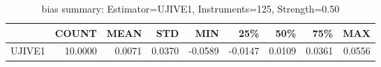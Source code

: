 \begin{table}[ht]
\centering
\caption{bias summary: Estimator=UJIVE1, Instruments=125, Strength=0.50}
\begin{tabular}{lrrrrrrrr}
\toprule
 & COUNT & MEAN & STD & MIN & 25\% & 50\% & 75\% & MAX \\
\midrule
UJIVE1 & 10.0000 & 0.0071 & 0.0370 & -0.0589 & -0.0147 & 0.0109 & 0.0361 & 0.0556 \\
\bottomrule
\end{tabular}
\end{table}
